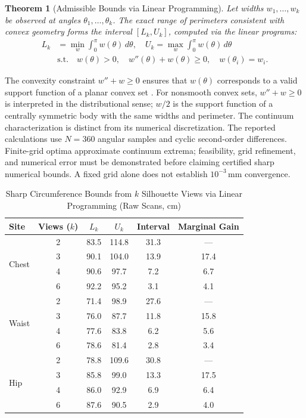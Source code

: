 \documentclass[journal]{IEEEtran}
\newtheorem{theorem}{Theorem}
\begin{document}
\begin{theorem}[Admissible Bounds via Linear Programming]
\label{thm:lp_bounds}
Let widths $w_1, \dots, w_k$ be observed at angles $\theta_1, \dots, \theta_k$. The exact range of perimeters consistent with convex geometry forms the interval $[L_k, U_k]$, computed via the linear programs:
\begin{equation}
\begin{aligned}
L_k &= \min_{w} \int_0^\pi w(\theta)\,d\theta, \quad U_k = \max_{w} \int_0^\pi w(\theta)\,d\theta \\
&\text{s.t.} \quad w(\theta) > 0, \quad w''(\theta) + w(\theta) \ge 0, \quad w(\theta_i) = w_i.
\end{aligned}
\label{eq:lp_program}
\end{equation}
\end{theorem}
The convexity constraint $w'' + w \ge 0$ ensures that $w(\theta)$ corresponds to a valid support function of a planar convex set \cite{schneider2014convex}. For nonsmooth convex sets, $w''+w\ge0$ is interpreted in the distributional sense; $w/2$ is the support function of a centrally symmetric body with the same widths and perimeter. The continuum characterization is distinct from its numerical discretization. The reported calculations use $N=360$ angular samples and cyclic second-order differences. Finite-grid optima approximate continuum extrema; feasibility, grid refinement, and numerical error must be demonstrated before claiming certified sharp numerical bounds. A fixed grid alone does not establish $10^{-3}$\,mm convergence.

\begin{table}[!t]
\caption{Sharp Circumference Bounds from $k$ Silhouette Views via Linear Programming (Raw Scans, cm)}
\label{tab:lp_results}
\centering
\begin{tabular}{lccccc}
\toprule
\textbf{Site} & \textbf{Views ($k$)} & $L_k$ & $U_k$ & \textbf{Interval} & \textbf{Marginal Gain} \\
\midrule
\multirow{4}{*}{Chest} 
& 2 & 83.5 & 114.8 & 31.3 & --- \\
& 3 & 90.1 & 104.0 & 13.9 & 17.4 \\
& 4 & 90.6 & 97.7 & 7.2 & 6.7 \\
& 6 & 92.2 & 95.2 & 3.1 & 4.1 \\
\midrule
\multirow{4}{*}{Waist} 
& 2 & 71.4 & 98.9 & 27.6 & --- \\
& 3 & 76.0 & 87.7 & 11.8 & 15.8 \\
& 4 & 77.6 & 83.8 & 6.2 & 5.6 \\
& 6 & 78.6 & 81.4 & 2.8 & 3.4 \\
\midrule
\multirow{4}{*}{Hip} 
& 2 & 78.8 & 109.6 & 30.8 & --- \\
& 3 & 85.8 & 99.0 & 13.3 & 17.5 \\
& 4 & 86.0 & 92.9 & 6.9 & 6.4 \\
& 6 & 87.6 & 90.5 & 2.9 & 4.0 \\
\bottomrule
\end{tabular}
\end{table}
\end{document}
